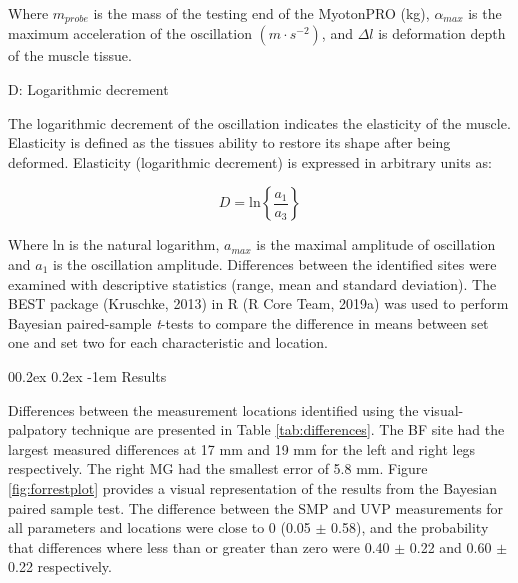 \documentclass[
  english,
  man,floatsintext]{apa6}
\makeatletter
\renewcommand{\paragraph}{\@startsection{paragraph}{4}{\parindent}%
  {0\baselineskip \@plus 0.2ex \@minus 0.2ex}%
  {-1em}%
  {\normalfont\normalsize\bfseries\itshape\typesectitle}}
\makeatother
\begin{document}
\noindent Where \(m_{probe}\) is the mass of the testing end of the MyotonPRO (kg), \(\alpha_{max}\) is the maximum acceleration of the oscillation \((m\cdot s^{-2})\), and \({\Delta l}\) is deformation depth of the muscle tissue.

\noindent D: Logarithmic decrement

\noindent The logarithmic decrement of the oscillation indicates the elasticity of the muscle. Elasticity is defined as the tissues ability to restore its shape after being deformed.
Elasticity (logarithmic decrement) is expressed in arbitrary units as:

\begin{equation} 
  D = \text{ln} \left\{\frac{a_1}{a_3}\right\}
  \label{eq:decrement}
\end{equation}

\noindent Where \(\text{ln}\) is the natural logarithm, \(a_{max}\) is the maximal amplitude of oscillation and \(a_1\) is the oscillation amplitude.
Differences between the identified sites were examined with descriptive statistics (range, mean and standard deviation).
The BEST package (Kruschke, 2013) in R (R Core Team, 2019a) was used to perform Bayesian paired-sample \emph{t}-tests to compare the difference in means between set one and set two for each characteristic and location.

\hypertarget{results-1}{%
\paragraph{Results}\label{results-1}}

Differences between the measurement locations identified using the visual-palpatory technique are presented in Table \ref{tab:differences}.
The BF site had the largest measured differences at 17 mm and 19 mm for the left and right legs respectively. The right MG had the smallest error of 5.8 mm.
Figure \ref{fig:forrestplot} provides a visual representation of the results from the Bayesian paired sample test.
The difference between the SMP and UVP measurements for all parameters and locations were close to 0 (0.05 \(\pm\) 0.58), and the probability that differences where less than or greater than zero were 0.40 \(\pm\) 0.22 and 0.60 \(\pm\) 0.22 respectively.
\end{document}
